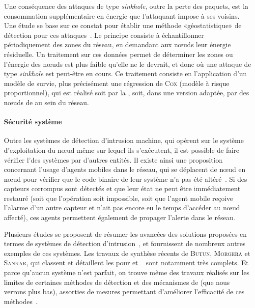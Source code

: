 Une conséquence des attaques de type \textit{sinkhole}, outre la perte des paquets, est la consommation supplémentaire en énergie que l'attaquant impose à ses voisins.
Une étude se base sur ce constat pour établir une méthode «géostatistique» de détection pour ces attaques~\cite{SKDM14}.
Le principe consiste à échantillonner périodiquement des zones du réseau, en demandant aux nœuds leur énergie résiduelle.
Un traitement sur ces données permet de déterminer les zones ou l'énergie des nœuds est plus faible qu'elle ne le devrait, et donc où une attaque de type \textit{sinkhole} est peut-être en cours.
Ce traitement consiste en l'application d'un modèle de survie, plus précisément une régression de \textsc{Cox} (modèle à risque proportionnel), qui est réalisé soit par la \sdb, soit, dans une version adaptée, par des nœuds de  au sein du réseau.

        \paragraph{Sécurité système}
Outre les systèmes de détection d'intrusion machine, qui opèrent sur le système d'exploitation du nœud même sur lequel ils s'exécutent, il est possible de faire vérifier l'\integrite des systèmes par d'autres entités.
Il existe ainsi une proposition concernant l'usage d'agents mobiles dans le réseau, qui se déplacent de nœud en nœud pour vérifier que le code binaire de leur système n'a pas été altéré~\cite{HR13}.
Si des capteurs corrompus sont détectés et que leur état ne peut être immédiatement restauré (soit que l'opération soit impossible, soit que l'agent mobile reçoive l'alarme d'un autre capteur et n'ait pas encore eu le temps d'accéder au nœud affecté), ces agents permettent également de propager l'alerte dans le réseau.

\bigskip
Plusieurs études se proposent de résumer les avancées des solutions proposées en termes de systèmes de détection d'intrusion~\cite{ME13,MS14}, et fournissent de nombreux autres exemples de ces systèmes.
Les travaux de synthèse récents de \textsc{Butun, Morgera} et \textsc{Sankar}, qui classent et détaillent les \IDS pour \manet et \rcsfs~\cite{BMS13} sont notamment très complets.
Et parce qu'aucun système \IDS n'est parfait, on trouve même des travaux réalisés sur les limites de certaines méthodes de détection et des mécanismes de  (que nous verrons plus bas), assorties de mesures permettant d'améliorer l'efficacité de ces méthodes~\cite{CQW12}.

